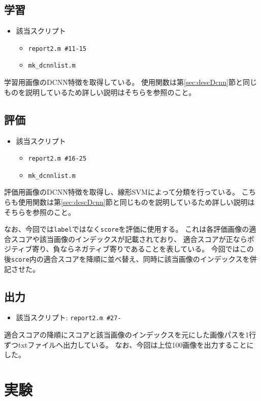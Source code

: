 \documentclass[11pt,a4paper, uplatex]{jsreport}
\begin{document}
\subsection{学習}
\begin{itemize}
  \item 該当スクリプト
  \begin{itemize}
    \item \texttt{report2.m \#11-15}
    \item \texttt{mk_dcnnlist.m}
  \end{itemize}
\end{itemize}
学習用画像のDCNN特徴を取得している。
使用関数は第\ref{sec:descDcnn}節と同じものを説明しているため詳しい説明はそちらを参照のこと。
\subsection{評価}
\begin{itemize}
  \item 該当スクリプト
  \begin{itemize}
    \item \texttt{report2.m \#16-25}
    \item \texttt{mk_dcnnlist.m}
  \end{itemize}
\end{itemize}
評価用画像のDCNN特徴を取得し、線形SVMによって分類を行っている。
こちらも使用関数は第\ref{sec:descDcnn}節と同じものを説明しているため詳しい説明はそちらを参照のこと。

なお、今回では\texttt{label}ではなく\texttt{score}を評価に使用する。
これは各評価画像の適合スコアや該当画像のインデックスが記載されており、
適合スコアが正ならポジティブ寄り、負ならネガティブ寄りであることを表している。
今回ではこの後\texttt{score}内の適合スコアを降順に並べ替え、同時に該当画像のインデックスを併記させた。

\subsection{出力}
\begin{itemize}
  \item 該当スクリプト: \texttt{report2.m \#27-}
\end{itemize}
適合スコアの降順にスコアと該当画像のインデックスを元にした画像パスを1行ずつtxtファイルへ出力している。
なお、今回は上位100画像を出力することにした。
\section{実験}
\end{document}
